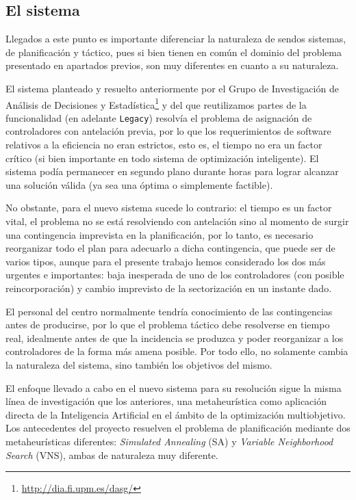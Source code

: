 \subsection{El sistema \legacy{}}
\label{capitulo:2:detalles-sistema}

Llegados a este punto es importante diferenciar la naturaleza de sendos sistemas, de planificación y táctico, pues si bien tienen en común el dominio del problema presentado en apartados previos, son muy diferentes en cuanto a su naturaleza.

El sistema planteado y resuelto anteriormente por el Grupo de Investigación de Análisis de Decisiones y Estadística\footnote{\url{http://dia.fi.upm.es/dasg/}} y del que reutilizamos partes de la funcionalidad (en adelante \texttt{Legacy}) resolvía el problema de asignación de controladores con antelación previa, por lo que los requerimientos de software relativos a la eficiencia no eran estrictos, esto es, el tiempo no era un factor crítico (si bien importante en todo sistema de optimización inteligente). El sistema podía permanecer en segundo plano durante horas para lograr alcanzar una solución válida (ya sea una óptima o simplemente factible).

No obstante, para el nuevo sistema sucede lo contrario: 
el tiempo es un factor vital, el problema no se está resolviendo con antelación sino al momento de surgir una contingencia imprevista en la planificación, por lo tanto, es necesario reorganizar todo el plan para adecuarlo a dicha contingencia, que puede ser de varios tipos, aunque para el presente trabajo hemos considerado los dos más urgentes e importantes: baja inesperada de uno de los controladores (con posible reincorporación) y cambio imprevisto de la sectorización en un instante dado.

El personal del centro normalmente tendría conocimiento de las contingencias antes de producirse, por lo que el problema táctico debe resolverse en tiempo real, idealmente antes de que la incidencia se produzca y poder reorganizar a los controladores de la forma más amena posible.
Por todo ello, no solamente cambia la naturaleza del sistema, sino también los objetivos del mismo.

El enfoque llevado a cabo en el nuevo sistema para su resolución sigue la misma línea de investigación que los anteriores, una metaheurística como aplicación directa de la Inteligencia Artificial en el ámbito de la optimización multiobjetivo.
Los antecedentes del proyecto resuelven el problema de planificación mediante dos metaheurísticas diferentes: \textit{Simulated Annealing} (SA) y \textit{Variable Neighborhood Search} (VNS), ambas de naturaleza muy diferente.
 

